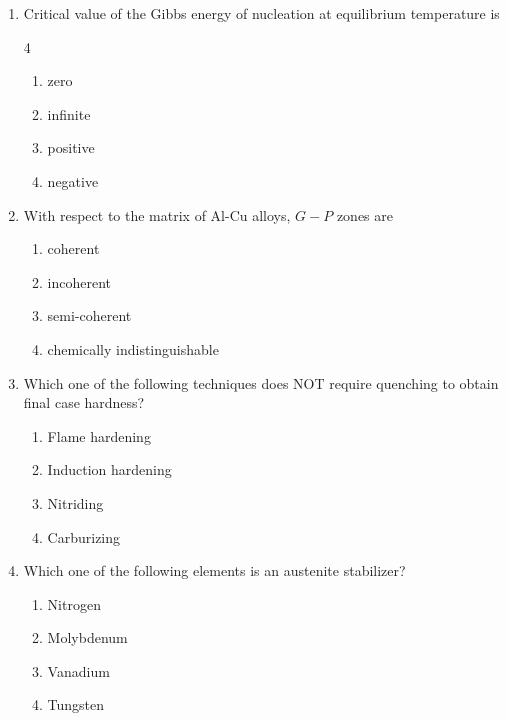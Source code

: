 \documentclass[journal]{IEEEtran}
\theoremstyle{remark}
\begin{document}
\begin{enumerate}
\item  Critical value of the Gibbs energy of nucleation at equilibrium temperature is \hfill{}

\begin {multicols}{4}
\begin{enumerate}
\item zero 
\item  infinite 
\item  positive
\item negative 
\end{enumerate}
\end{multicols}

\item  With respect to the matrix of Al-Cu alloys, $G-P$ zones are 
\hfill{}
\begin{multicols}{2}
\begin{enumerate}
\item coherent 
\item incoherent
\item  semi-coherent
\item chemically indistinguishable 
\end{enumerate}
\end{multicols}

\item  Which one of the following techniques does NOT require quenching to obtain final case hardness? \hfill{}
\begin{multicols}{2}
    

\begin{enumerate}
\item Flame hardening 
\item Induction hardening
\item  Nitriding
\item Carburizing
\end{enumerate}
\end{multicols}

\item Which one of the following elements is an austenite stabilizer? 
 \hfill{}
\begin{multicols}{4}
\begin{enumerate}
\item Nitrogen 
\item  Molybdenum
\item  Vanadium 
\item Tungsten 
\end{enumerate}
\end{multicols}


\end{enumerate}
\end{document}
